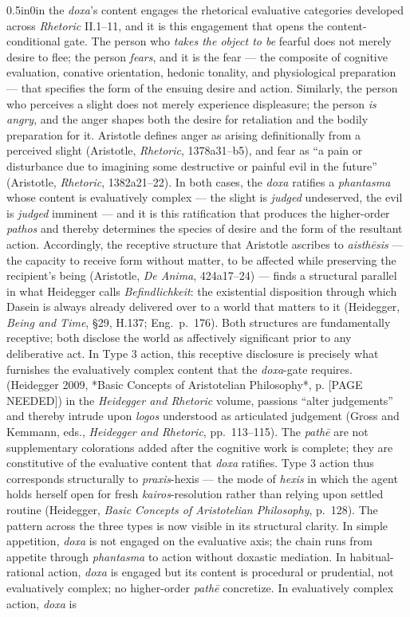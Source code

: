 \documentclass{article}
\begin{document}
\begin{adjustwidth}{0.5in}{0in}
the \textit{doxa}'s content engages the rhetorical evaluative categories developed across \textit{Rhetoric} II.1--11, and it is this engagement that opens the content-conditional gate. The person who \textit{takes the object to be} fearful does not merely desire to flee; the person \textit{fears}, and it is the fear --- the composite of cognitive evaluation, conative orientation, hedonic tonality, and physiological preparation --- that specifies the form of the ensuing desire and action. Similarly, the person who perceives a slight does not merely experience displeasure; the person \textit{is angry}, and the anger shapes both the desire for retaliation and the bodily preparation for it. Aristotle defines anger as arising definitionally from a perceived slight (Aristotle, \textit{Rhetoric}, 1378a31--b5), and fear as ``a pain or disturbance due to imagining some destructive or painful evil in the future'' (Aristotle, \textit{Rhetoric}, 1382a21--22). In both cases, the \textit{doxa} ratifies a \textit{phantasma} whose content is evaluatively complex --- the slight is \textit{judged} undeserved, the evil is \textit{judged} imminent --- and it is this ratification that produces the higher-order \textit{pathos} and thereby determines the species of desire and the form of the resultant action. Accordingly, the receptive structure that Aristotle ascribes to \textit{aisth\=esis} --- the capacity to receive form without matter, to be affected while preserving the recipient's being (Aristotle, \textit{De Anima}, 424a17--24) --- finds a structural parallel in what Heidegger calls \textit{Befindlichkeit}: the existential disposition through which Dasein is always already delivered over to a world that matters to it (Heidegger, \textit{Being and Time}, \S29, H.137; Eng.~p.~176). Both structures are fundamentally receptive; both disclose the world as affectively significant prior to any deliberative act. In Type 3 action, this receptive disclosure is precisely what furnishes the evaluatively complex content that the \textit{doxa}-gate requires. (Heidegger 2009, *Basic Concepts of Aristotelian Philosophy*, p. [PAGE NEEDED]) in the \textit{Heidegger and Rhetoric} volume, passions ``alter judgements'' and thereby intrude upon \textit{logos} understood as articulated judgement (Gross and Kemmann, eds., \textit{Heidegger and Rhetoric}, pp.~113--115). The \textit{path\=e} are not supplementary colorations added after the cognitive work is complete; they are constitutive of the evaluative content that \textit{doxa} ratifies. Type 3 action thus corresponds structurally to \textit{praxis}-hexis --- the mode of \textit{hexis} in which the agent holds herself open for fresh \textit{kairos}-resolution rather than relying upon settled routine (Heidegger, \textit{Basic Concepts of Aristotelian Philosophy}, p.~128). The pattern across the three types is now visible in its structural clarity. In simple appetition, \textit{doxa} is not engaged on the evaluative axis; the chain runs from appetite through \textit{phantasma} to action without doxastic mediation. In habitual-rational action, \textit{doxa} is engaged but its content is procedural or prudential, not evaluatively complex; no higher-order \textit{path\=e} concretize. In evaluatively complex action, \textit{doxa} is 
\end{adjustwidth}
\end{document}
